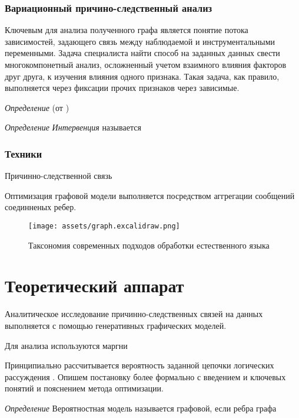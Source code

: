 \subsubsection{Вариационный причино-следственный анализ}

Ключевым для анализа полученного графа является понятие потока зависимостей, задающего связь между наблюдаемой и инструментальными переменными.
Задача специалиста найти способ на заданных данных свести многокомпонетный анализ, осложненный учетом
взаимного влияния факторов друг друга, к изучения влияния одного признака. Такая задача, как правило, выполняется через 
фиксации прочих признаков через зависимые. 

\textit{Определение} (от  ) 


\textit{Определение} \textit{Интервенция} называется


\subsubsection{Техники}

Причинно-следственной связь

Оптимизация графовой модели выполняется посредством аггрегации сообщений соединненых ребер.

\begin{figure}[h]
    \centering
    \texttt{[image: assets/graph.excalidraw.png]}
    \caption{Таксономия современных подходов обработки естественного языка}
    \label{llm_taxonomy}
\end{figure}



\section{Теоретический аппарат}




Аналитическое исследование причинно-следственных связей на данных выполняется с помощью генеративных графических моделей.

Для анализа используются маргни



Принципиально рассчитывается вероятность заданной цепочки логических рассуждения .
Опишем постановку более формально с введением и ключевых понятий и пояснением метода оптимизации. 

\textit{Определение} Вероятностная модель называется графовой, если ребра графа

